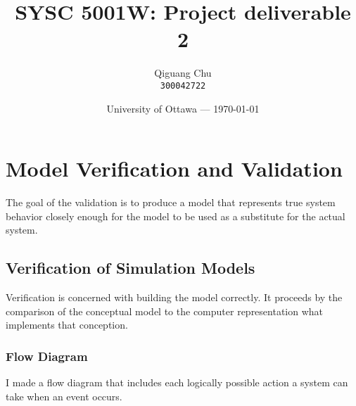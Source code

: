 \documentclass{article}
\title{SYSC 5001W: Project deliverable 2} %
\author{Qiguang Chu\\ \texttt{300042722}} %
\date{University of Ottawa --- \today} %
\begin{document}
\maketitle

\section{Model Verification and Validation}

The goal of the validation is to produce a model that represents true system behavior closely enough for the model
to be used as a substitute for the actual system. 

\subsection{Verification of Simulation Models}

Verification is concerned with building the model correctly. It proceeds by the comparison of the conceptual model to the computer representation what implements that conception.

\subsubsection{Flow Diagram}
I made a flow diagram that includes each logically possible action a system can take when an event occurs.
\end{document}
